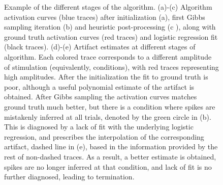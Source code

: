\documentclass[12pt,letterpaper,fleqn]{article}
\begin{document}
\begin{figure}[ht!]
\caption{Example of the different stages of the algorithm. (a)-(c) Algorithm activation curves (blue traces) after initialization (a), first Gibbs sampling iteration (b) and heuristic post-processing (c ), along with ground truth activation curves (red traces) and logistic regression fit (black traces). (d)-(e) Artifact estimates at different stages of algorithm. Each colored trace corresponds to a different amplitude of stimulation (equivalently, conditions), with red traces representing high amplitudes. After the initialization the fit to ground truth is poor, although a useful polynomial estimate of the artifact is obtained. After Gibbs sampling the activation curves matches ground truth much better, but there is a condition where spikes are mistakenly inferred at all trials, denoted by the green circle in (b). This is diagnosed by a lack of fit with the underlying logistic regression, and prescribes the interpolation of the corresponding artifact, dashed line in (e), based in the information provided by the rest of non-dashed traces. As a result, a better estimate is obtained, spikes are no longer inferred at that condition, and lack of fit is no further diagnosed, leading to termination.}
\label{fig:traces}
\end{figure}
\end{document}
